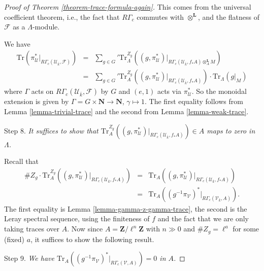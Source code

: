 \begin{proof}[Proof of Theorem \ref{theorem-trace-formula-again}]
\medskip\noindent
This comes from the universal coefficient theorem, i.e., the fact that
$R\Gamma_c$ commutes with $\otimes^\mathbf{L}$, and the flatness of
$\mathcal{F}$ as a $\Lambda$-module.

\medskip\noindent
We have
\begin{eqnarray*}
\text{Tr}(
\pi_\mathcal{U}^* |_{R\Gamma_c(\mathcal{U}_{\bar k}, \mathcal{F})})
& = &
{\sum_{g \in G}}'
\text{Tr}_{\Lambda}^{Z_g}
\left(
(g, \pi_\mathcal{U}^*)
|_{R\Gamma_c(\mathcal{U}_{\bar k}, f_*A)\otimes_A^\mathbf{L} M}
\right) \\
& = &
{\sum_{g\in G}}'
\text{Tr}_A^{Z_g}
(
(g, \pi_\mathcal{U}^*) |_{R\Gamma_c(\mathcal{U}_{\bar k}, f_*A)}
)
\cdot
\text{Tr}_\Lambda(g|_M)
\end{eqnarray*}
where $\Gamma$ acts on $R\Gamma_c(\mathcal{U}_{\bar k}, \mathcal{F})$ by $G$
and $(e, 1)$ acts via $\pi_\mathcal{U}^*$. So the monoidal extension is given
by $\Gamma = G \times \mathbf{N} \to \mathbf{N}$, $\gamma \mapsto 1$. The first
equality follows from Lemma \ref{lemma-trivial-trace} and the second from
Lemma \ref{lemma-weak-trace}.

\medskip\noindent
Step 8. {\it It suffices to show that
$\text{Tr}_A^{Z_g}((g, \pi_\mathcal{U}^*)
|_{R\Gamma_c(\mathcal{U}_{\bar k}, f_*A)}) \in A$
maps to zero in $\Lambda$.
}

\medskip\noindent
Recall that
\begin{eqnarray*}
\# Z_g \cdot \text{Tr}_A^{Z_g}((g, \pi_\mathcal{U}^*)
|_{R\Gamma_c(\mathcal{U}_{\bar k}, f_*A)})
& = & \text{Tr}_A((g, \pi_\mathcal{U}^*)
|_{R\Gamma_c(\mathcal{U}_{\bar k}, f_*A)})\\
& = &
\text{Tr}_A((g^{-1}\pi_\mathcal{V})^* |_{R\Gamma_c(\mathcal{V}_{\bar k}, A)}).
\end{eqnarray*}
The first equality is
Lemma \ref{lemma-gamma-z-gamma-trace},
the second is the Leray
spectral sequence, using the finiteness of $f$ and the fact that we are only
taking traces over $A$. Now since $A=\mathbf{Z}/\ell^n\mathbf{Z}$ with
$n \gg 0$ and $\# Z_g = \ell^a$ for some (fixed) $a$,
it suffices to show the following result.

\medskip\noindent
Step 9. {\it We have
$\text{Tr}_A((g^{-1}\pi_\mathcal{V})^* |_{R\Gamma_c(\mathcal{V}, A)}) = 0$
in $A$.}


\end{proof}
